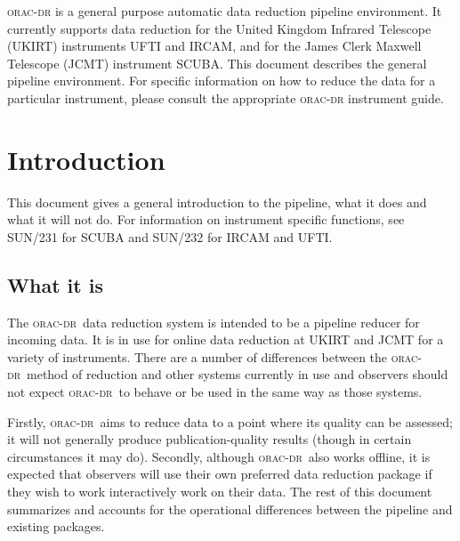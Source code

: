 \documentclass[twoside,11pt]{article}
\newcommand{\stardocinitials}  {SUN}
\newcommand{\stardocnumber}    {230.0}
\newcommand{\stardocabstract}  {\textsc{orac-dr} is a general purpose
automatic data reduction pipeline environment. It currently supports data
reduction for the United Kingdom Infrared Telescope (UKIRT) instruments UFTI
and IRCAM, and for the James Clerk Maxwell Telescope (JCMT) instrument
SCUBA. This document describes the general pipeline environment. For specific
information on how to reduce the data for a particular instrument, please
consult the appropriate \textsc{orac-dr} instrument guide.}
\newcommand{\stardocname}{\stardocinitials /\stardocnumber}
\newenvironment{latexonly}{}{}
\newcommand{\xref}[3]{#1}
\newcommand{\xlabel}[1]{}
\renewcommand{\_}{\texttt{\symbol{95}}}
\def\C++{{\rm C\kern-.05em\raise.3ex\hbox{\footnotesize ++}}}
\newcommand{\underscore}{\_}
\newcommand{\oracdr}{\textsc{orac-dr}}
\renewcommand{\thepage}{\roman{page}}
\begin{document}
\stardocabstract
  \newpage
  \begin{latexonly}
    \setlength{\parskip}{0mm}
    \tableofcontents
    \setlength{\parskip}{\medskipamount}
    \markboth{\stardocname}{\stardocname}
  \end{latexonly}
\cleardoublepage
\renewcommand{\thepage}{\arabic{page}}
\setcounter{page}{1}



\section{Introduction\xlabel{introduction}}

This document gives a general introduction to the pipeline, what it
does and what it will not do. For information on instrument
specific functions, see \xref{SUN/231}{sun231}{} for SCUBA and
\xref{SUN/232}{sun232}{} for IRCAM and UFTI.

\subsection*{What it is}

The \oracdr\ data reduction system is intended to be a pipeline reducer
for incoming data. It is in use for online data reduction at UKIRT and
JCMT for a variety of instruments. There are a number of differences
between the \oracdr\ method of reduction and other systems currently in
use and observers should not expect \oracdr\ to behave or be used in
the same way as those systems.

Firstly, \oracdr\ aims to reduce data to a point where its quality can
be assessed; it will not generally produce publication-quality results
(though in certain circumstances it may do).  Secondly, although
\oracdr\ also works offline, it is expected that observers will use
their own preferred data reduction package if they wish to work
interactively work on their data. The rest of this document summarizes
and accounts for the operational differences between the pipeline and
existing packages.
\end{document}
